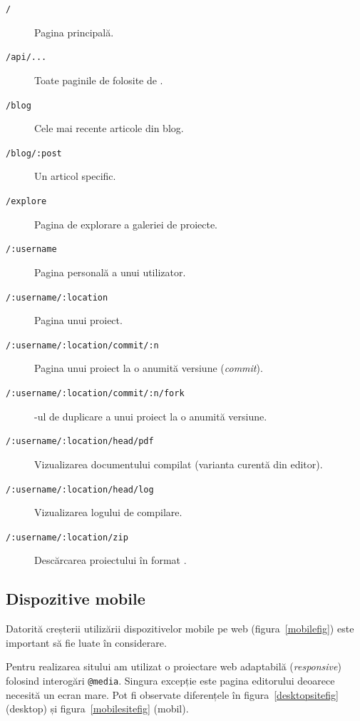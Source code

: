\documentclass[a4wide,12pt]{report}
\newcommand{\eng}[1]{\emph{#1}} %
\newcommand{\cod}[1]{\texttt{#1}}
\newcommand{\acr}[1]{{\textsmaller[1]{\textsc{#1}}}} %
\begin{document}
\begin{description}

\item[\cod{/}] Pagina principală.

\item[\cod{/api/...}] Toate paginile de folosite de \acr{API}.

\item[\cod{/blog}] Cele mai recente articole din blog.

\item[\cod{/blog/:post}] Un articol specific.

\item[\cod{/explore}] Pagina de explorare a galeriei de proiecte.

\item[\cod{/:username}] Pagina personală a unui utilizator.

\item[\cod{/:username/:location}] Pagina unui proiect.

\item[\cod{/:username/:location/commit/:n}] Pagina unui proiect la o anumită
versiune (\eng{commit}).

\item[\cod{/:username/:location/commit/:n/fork}] \acr{URL}-ul de duplicare a
unui proiect la o anumită versiune.

\item[\cod{/:username/:location/head/pdf}] Vizualizarea documentului compilat
(varianta curentă din editor).

\item[\cod{/:username/:location/head/log}] Vizualizarea logului de compilare.

\item[\cod{/:username/:location/zip}] Descărcarea proiectului în format \acr{ZIP}.

\end{description}

\subsection{Dispozitive mobile}

Datorită creșterii utilizării dispozitivelor mobile pe web
(figura~\ref{mobilefig}) este important să fie luate în considerare.

Pentru realizarea sitului am utilizat o proiectare web adaptabilă
(\eng{responsive}) folosind interogări \cod{@media}. Singura excepție este
pagina editorului deoarece necesită un ecran mare. Pot fi observate diferențele
în figura~\ref{desktopsitefig} (desktop) și figura~\ref{mobilesitefig} (mobil).
\end{document}
